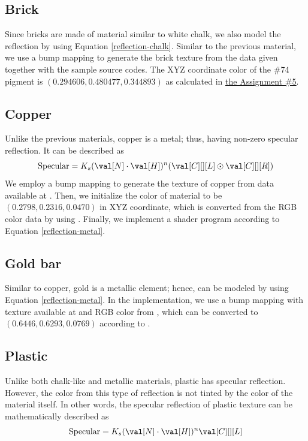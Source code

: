 \subsection{Brick}

Since bricks are made of material similar to white chalk, we also model the reflection by using Equation \eqref{reflection-chalk}. Similar to the previous material, we use a bump mapping to generate the brick texture from the data given together with the sample source codes. The XYZ coordinate color of the \#74 pigment is $(0.294606,0.480477,0.344893)$ as calculated in 
\href{https://colab.research.google.com/drive/1KD-4itGSez7aZ8Xvt2FDbf4bOZyQURiZ?usp=sharing}{\underline{the Assignment \#5}}.

\subsection{Copper}

Unlike the previous materials, copper is a metal; thus, having non-zero specular reflection. It can be described as
\begin{equation}\label{reflection-metal}
    \text{Specular} = K_s (\val[N] \cdot \val[H])^n (\val[C][][L] \odot \val[C][][R])
\end{equation}
We employ a bump mapping to generate the texture of copper from data available at \cite{texture-copper}. Then, we initialize the color of material to be $(0.2798,0.2316,0.0470)$ in XYZ coordinate, which is converted from the RGB color data \cite{color-copper} by using \cite{color-converter}. Finally, we implement a shader program according to Equation \eqref{reflection-metal}.

\subsection{Gold bar}

Similar to copper, gold is a metallic element; hence, can be modeled by using Equation \eqref{reflection-metal}. In the implementation, we use a bump mapping with texture available at \cite{texture-gold} and RGB color from \cite{color-gold}, which can be converted to $(0.6446,0.6293,0.0769)$ according to \cite{color-converter}.

\subsection{Plastic}

Unlike both chalk-like and metallic materials, plastic has specular reflection. However, the color from this type of reflection is not tinted by the color of the material itself. In other words, the specular reflection of plastic texture can be mathematically described as
\begin{equation}\label{reflection-plastic}
    \text{Specular} = K_s (\val[N] \cdot \val[H])^n \val[C][][L]
\end{equation}

